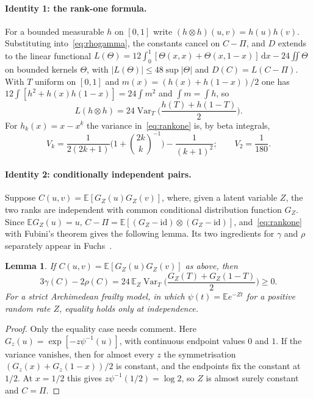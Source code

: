 \documentclass[11pt,a4paper]{article}
\newtheorem{lemma}[theorem]{Lemma}
\theoremstyle{remark}
\newcommand{\EE}{\mathbb{E}}
\newcommand{\dd}{\,\mathrm d}
\DeclareMathOperator{\Var}{Var}
\begin{document}
\paragraph{Identity 1: the rank-one formula.} For a bounded measurable $h$ on $[0,1]$ write $(h\otimes h)(u,v)=h(u)h(v)$. Substituting into~\eqref{eq:rhogamma}, the constants cancel on $C-\Pi$, and $D$ extends to the linear functional $L(\Theta)=12\int_0^1[\Theta(x,x)+\Theta(x,1-x)]\dd x-24\iint\Theta$ on bounded kernels $\Theta$, with $|L(\Theta)|\leq48\sup|\Theta|$ and $D(C)=L(C-\Pi)$. With $T$ uniform on $[0,1]$ and $m(x)=(h(x)+h(1-x))/2$ one has $12\int[h^2+h(x)h(1-x)]=24\int m^2$ and $\int m=\int h$, so
\begin{equation}
 L(h\otimes h)=24\Var_T\Big(\frac{h(T)+h(1-T)}{2}\Big).\label{eq:rankone}
\end{equation}
For $h_k(x)=x-x^k$ the variance in~\eqref{eq:rankone} is, by beta integrals,
\begin{equation}
 V_k=\frac{1}{2(2k+1)}\Big(1+\binom{2k}{k}^{-1}\Big)-\frac1{(k+1)^2};\qquad V_2=\frac1{180}.\label{eq:Vk}
\end{equation}

\paragraph{Identity 2: conditionally independent pairs.} Suppose $C(u,v)=\EE[G_Z(u)G_Z(v)]$, where, given a latent variable $Z$, the two ranks are independent with common conditional distribution function $G_Z$. Since $\EE G_Z(u)=u$, $C-\Pi=\EE[(G_Z-\mathrm{id})\otimes(G_Z-\mathrm{id})]$, and~\eqref{eq:rankone} with Fubini's theorem gives the following lemma. Its two ingredients for $\gamma$ and $\rho$ separately appear in Fuchs~\cite[Theorem~6 and Corollary~5]{fuchs}.

\begin{lemma}\label{lem:variance}
If $C(u,v)=\EE[G_Z(u)G_Z(v)]$ as above, then
\[
 3\gamma(C)-2\rho(C)=24\,\EE_Z\Var_T\Big(\frac{G_Z(T)+G_Z(1-T)}{2}\Big)\geq0 .
\]
For a strict Archimedean frailty model, in which $\psi(t)=\EE e^{-Zt}$ for a positive random rate $Z$, equality holds only at independence.
\end{lemma}
\begin{proof}
Only the equality case needs comment. Here $G_z(u)=\exp[-z\psi^{-1}(u)]$, with continuous endpoint values $0$ and $1$. If the variance vanishes, then for almost every $z$ the symmetrisation $(G_z(x)+G_z(1-x))/2$ is constant, and the endpoints fix the constant at $1/2$. At $x=1/2$ this gives $z\psi^{-1}(1/2)=\log2$, so $Z$ is almost surely constant and $C=\Pi$.
\end{proof}
\end{document}

